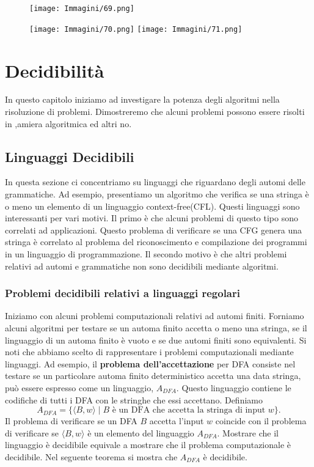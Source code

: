 \documentclass{article}
\begin{document}
\begin{figure}[H]
    \centering
    \texttt{[image: Immagini/69.png]}
    \label{fig:example_image1}
\end{figure}

\begin{figure}[H]
    \centering
    \texttt{[image: Immagini/70.png]}
    \texttt{[image: Immagini/71.png]}
    \label{fig:example_image2}
\end{figure}
\newpage

\section{Decidibilità}
In questo capitolo iniziamo ad investigare la potenza degli algoritmi nella risoluzione di problemi.
Dimostreremo che alcuni problemi possono essere risolti in ,amiera algoritmica ed altri no.

\subsection{Linguaggi Decidibili}

In questa sezione ci concentriamo su linguaggi che riguardano degli automi delle grammatiche.
Ad esempio, presentiamo un algoritmo che verifica se una stringa è o meno un elemento di un linguaggio context-free(CFL).
Questi linguaggi sono interessanti per vari motivi.
Il primo è che alcuni problemi di questo tipo sono correlati ad applicazioni.
Questo problema di verificare se una CFG genera una stringa è correlato al problema del riconoscimento e compilazione dei programmi in un linguaggio di programmazione.
Il secondo motivo è che altri problemi relativi ad automi e grammatiche non sono decidibili mediante algoritmi.

\subsubsection{Problemi decidibili relativi a linguaggi regolari}
Iniziamo con alcuni problemi computazionali relativi ad automi finiti.
Forniamo alcuni algoritmi per testare se un automa finito accetta o meno una stringa, se il linguaggio di un automa finito è vuoto e se due automi finiti sono equivalenti.
Si noti che abbiamo scelto di rappresentare i problemi computazionali mediante linguaggi.
Ad esempio, il \textbf{problema dell'accettazione} per DFA consiste nel testare se un particolare automa finito deterministico accetta una data stringa, può essere espresso come un linguaggio, $A_{DFA}$.
Questo linguaggio contiene le codifiche di tutti i DFA con le stringhe che essi accettano.
Definiamo 
$$
A_{DFA} = \{\langle B,w \rangle \mid B \text{ è un DFA che accetta la stringa di input } w \}.
$$
Il problema di verificare se un DFA $B$ accetta l'input $w$ coincide con il problema di verificare se $\langle B,w \rangle$ è un elemento del linguaggio $A_{DFA}$.
Mostrare che il linguaggio è decidibile equivale a mostrare che il problema computazionale è decidibile.
Nel seguente teorema si mostra che $A_{DFA}$ è decidibile.
\end{document}
